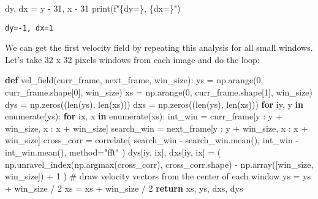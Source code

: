 \documentclass[
  english,
  letterpaper,
  numbers=noendperiod,
  DIV=13]{scrreprt}
\newenvironment{Shaded}{\begin{snugshade}}{\end{snugshade}}
\newcommand{\BuiltInTok}[1]{\textcolor[rgb]{0.00,0.23,0.31}{#1}}
\newcommand{\CommentTok}[1]{\textcolor[rgb]{0.37,0.37,0.37}{#1}}
\newcommand{\ControlFlowTok}[1]{\textcolor[rgb]{0.00,0.23,0.31}{\textbf{#1}}}
\newcommand{\DecValTok}[1]{\textcolor[rgb]{0.68,0.00,0.00}{#1}}
\newcommand{\KeywordTok}[1]{\textcolor[rgb]{0.00,0.23,0.31}{\textbf{#1}}}
\newcommand{\NormalTok}[1]{\textcolor[rgb]{0.00,0.23,0.31}{#1}}
\newcommand{\OperatorTok}[1]{\textcolor[rgb]{0.37,0.37,0.37}{#1}}
\newcommand{\SpecialCharTok}[1]{\textcolor[rgb]{0.37,0.37,0.37}{#1}}
\newcommand{\SpecialStringTok}[1]{\textcolor[rgb]{0.13,0.47,0.30}{#1}}
\newcommand{\StringTok}[1]{\textcolor[rgb]{0.13,0.47,0.30}{#1}}
\begin{document}
\begin{Shaded}
\begin{Highlighting}[]
\NormalTok{dy, dx }\OperatorTok{=}\NormalTok{ y }\OperatorTok{{-}} \DecValTok{31}\NormalTok{, x }\OperatorTok{{-}} \DecValTok{31}
\BuiltInTok{print}\NormalTok{(}\SpecialStringTok{f"}\SpecialCharTok{\{}\NormalTok{dy}\OperatorTok{=}\SpecialCharTok{\}}\SpecialStringTok{, }\SpecialCharTok{\{}\NormalTok{dx}\OperatorTok{=}\SpecialCharTok{\}}\SpecialStringTok{"}\NormalTok{)}
\end{Highlighting}
\end{Shaded}

\begin{verbatim}
dy=-1, dx=1
\end{verbatim}

We can get the first velocity field by repeating this analysis for all
small windows. Let's take 32 x 32 pixels windows from each image and do
the loop:

\begin{Shaded}
\begin{Highlighting}[]
\KeywordTok{def}\NormalTok{ vel\_field(curr\_frame, next\_frame, win\_size):}
\NormalTok{    ys }\OperatorTok{=}\NormalTok{ np.arange(}\DecValTok{0}\NormalTok{, curr\_frame.shape[}\DecValTok{0}\NormalTok{], win\_size)}
\NormalTok{    xs }\OperatorTok{=}\NormalTok{ np.arange(}\DecValTok{0}\NormalTok{, curr\_frame.shape[}\DecValTok{1}\NormalTok{], win\_size)}
\NormalTok{    dys }\OperatorTok{=}\NormalTok{ np.zeros((}\BuiltInTok{len}\NormalTok{(ys), }\BuiltInTok{len}\NormalTok{(xs)))}
\NormalTok{    dxs }\OperatorTok{=}\NormalTok{ np.zeros((}\BuiltInTok{len}\NormalTok{(ys), }\BuiltInTok{len}\NormalTok{(xs)))}
    \ControlFlowTok{for}\NormalTok{ iy, y }\KeywordTok{in} \BuiltInTok{enumerate}\NormalTok{(ys):}
        \ControlFlowTok{for}\NormalTok{ ix, x }\KeywordTok{in} \BuiltInTok{enumerate}\NormalTok{(xs):}
\NormalTok{            int\_win }\OperatorTok{=}\NormalTok{ curr\_frame[y : y }\OperatorTok{+}\NormalTok{ win\_size, x : x }\OperatorTok{+}\NormalTok{ win\_size]}
\NormalTok{            search\_win }\OperatorTok{=}\NormalTok{ next\_frame[y : y }\OperatorTok{+}\NormalTok{ win\_size, x : x }\OperatorTok{+}\NormalTok{ win\_size]}
\NormalTok{            cross\_corr }\OperatorTok{=}\NormalTok{ correlate(}
\NormalTok{                search\_win }\OperatorTok{{-}}\NormalTok{ search\_win.mean(), int\_win }\OperatorTok{{-}}\NormalTok{ int\_win.mean(), method}\OperatorTok{=}\StringTok{"fft"}
\NormalTok{            )}
\NormalTok{            dys[iy, ix], dxs[iy, ix] }\OperatorTok{=}\NormalTok{ (}
\NormalTok{                np.unravel\_index(np.argmax(cross\_corr), cross\_corr.shape)}
                \OperatorTok{{-}}\NormalTok{ np.array([win\_size, win\_size])}
                \OperatorTok{+} \DecValTok{1}
\NormalTok{            )}
    \CommentTok{\# draw velocity vectors from the center of each window}
\NormalTok{    ys }\OperatorTok{=}\NormalTok{ ys }\OperatorTok{+}\NormalTok{ win\_size }\OperatorTok{/} \DecValTok{2}
\NormalTok{    xs }\OperatorTok{=}\NormalTok{ xs }\OperatorTok{+}\NormalTok{ win\_size }\OperatorTok{/} \DecValTok{2}
    \ControlFlowTok{return}\NormalTok{ xs, ys, dxs, dys}
\end{Highlighting}
\end{Shaded}
\end{document}
